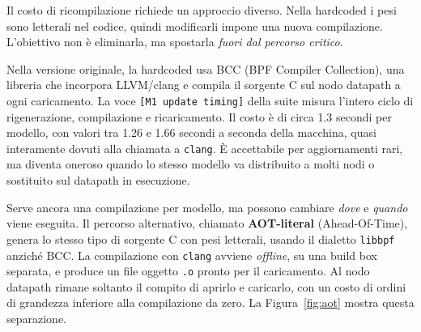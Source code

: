 \documentclass[binding=0.6cm,italian,oneside,noexaminfo]{sapthesis}
\begin{document}
Il costo di ricompilazione richiede un approccio diverso. Nella hardcoded i pesi sono letterali nel codice, quindi modificarli impone una nuova compilazione. L'obiettivo non è eliminarla, ma spostarla \emph{fuori dal percorso critico}.

Nella versione originale, la hardcoded usa BCC (BPF Compiler Collection), una libreria che incorpora LLVM/clang e compila il sorgente C sul nodo datapath a ogni caricamento. La voce \texttt{[M1 update timing]} della suite misura l'intero ciclo di rigenerazione, compilazione e ricaricamento. Il costo è di circa 1.3 secondi per modello, con valori tra 1.26 e 1.66 secondi a seconda della macchina, quasi interamente dovuti alla chiamata a \texttt{clang}. È accettabile per aggiornamenti rari, ma diventa oneroso quando lo stesso modello va distribuito a molti nodi o sostituito sul datapath in esecuzione.

Serve ancora una compilazione per modello, ma possono cambiare \emph{dove} e \emph{quando} viene eseguita. Il percorso alternativo, chiamato \textbf{AOT-literal} (Ahead-Of-Time), genera lo stesso tipo di sorgente C con pesi letterali, usando il dialetto \texttt{libbpf} anziché BCC. La compilazione con \texttt{clang} avviene \emph{offline}, su una build box separata, e produce un file oggetto \texttt{.o} pronto per il caricamento. Al nodo datapath rimane soltanto il compito di aprirlo e caricarlo, con un costo di ordini di grandezza inferiore alla compilazione da zero. La Figura~\ref{fig:aot} mostra questa separazione.
\end{document}
